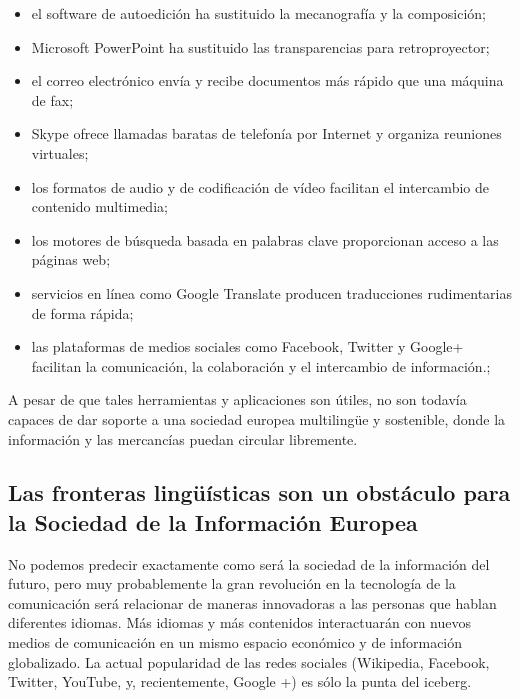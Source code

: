 \begin{multicols}{2}
\begin{itemize}
  \item el software de autoedición ha sustituido la mecanografía y la composición;
  \item Microsoft PowerPoint ha sustituido las transparencias para retroproyector;
  \item el correo electrónico envía y recibe documentos más rápido que una máquina de fax;
  \item Skype ofrece llamadas baratas de telefonía por Internet y organiza reuniones virtuales;
  \item los formatos de audio y de codificación de vídeo facilitan el intercambio de contenido multimedia;
  \item los motores de búsqueda basada en palabras clave proporcionan acceso a las páginas web;
  \item servicios en línea como Google Translate producen traducciones rudimentarias de forma rápida;
  \item las plataformas de medios sociales como Facebook, Twitter y Google+ facilitan la comunicación, la colaboración y el intercambio de información.;

\end{itemize}

  A pesar de que tales herramientas y aplicaciones son útiles, no son todavía capaces de dar soporte a una sociedad europea multilingüe y sostenible, donde la información y las mercancías puedan circular libremente.

\subsection{Las fronteras lingüísticas son un obstáculo para la Sociedad de la Información Europea}
  
  No podemos predecir exactamente como será la sociedad de la información del futuro, pero muy probablemente la gran revolución en la tecnología de la comunicación será relacionar de maneras innovadoras a las personas que hablan diferentes idiomas. Más idiomas y más contenidos interactuarán con nuevos  medios de comunicación en un mismo espacio económico y de información globalizado. La actual popularidad de las redes sociales (Wikipedia, Facebook, Twitter, YouTube, y, recientemente, Google +) es sólo la punta del iceberg.



\end{multicols}
